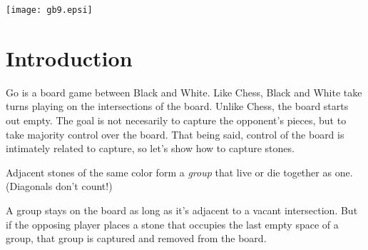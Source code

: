 \documentclass{article}
\begin{document}
\hbox{}
\vfill

\begin{center}
\texttt{[image: gb9.epsi]}
\end{center}

\vfill

\newpage

\section*{Introduction}
Go is a board game between Black and White.  Like Chess, Black and
White take turns playing on the intersections of the board.  Unlike
Chess, the board starts out empty. The goal is not necesarily to
capture the opponent's pieces, but to take majority control over the
board.  That being said, control of the board is intimately related to
capture, so let's show how to capture stones.

Adjacent stones of the same color form a \emph{group} that live or die
together as one.  (Diagonals don't count!)

\begin{center}
\cleargoban
{}
\hspace{.5in}%
\hspace{.5in}%
\end{center}
%
A group stays on the board as long as it's adjacent to a vacant
intersection.  But if the opposing player places a stone that occupies
the last empty space of a group, that group is captured and removed
from the board.


\begin{center}
\cleargoban
{}
\hspace{1in}%
\hspace{1in}%
\end{center}
\end{document}
